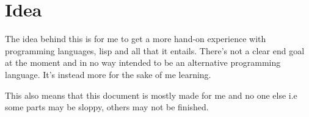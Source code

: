 
\section{Idea}

The idea behind this is for me to get a more hand-on experience with programming languages, lisp and all that it entails. 
There's not a clear end goal at the moment and in no way intended to be an alternative programming language. 
It's instead more for the sake of me learning. 

This also means that this document is mostly made for me and no one else i.e some parts may be sloppy, others may not be finished. 

